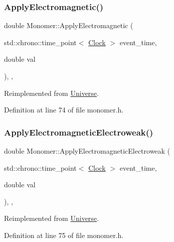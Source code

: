 \subsubsection{\texorpdfstring{Apply\+Electromagnetic()}{ApplyElectromagnetic()}}
{\footnotesize\ttfamily double Monomer\+::\+Apply\+Electromagnetic (\begin{DoxyParamCaption}\item[{std\+::chrono\+::time\+\_\+point$<$ \hyperlink{universe_8h_a0ef8d951d1ca5ab3cfaf7ab4c7a6fd80}{Clock} $>$}]{event\+\_\+time,  }\item[{double}]{val }\end{DoxyParamCaption})\hspace{0.3cm}{\ttfamily [inline]}, {\ttfamily [final]}, {\ttfamily [virtual]}}



Reimplemented from \hyperlink{class_universe_a1f787da78fa196ba635db21a9e91dabb}{Universe}.



Definition at line 74 of file monomer.\+h.

\mbox{\label{class_monomer_a4c3f9894ea57047789bec32602f033cb}} 
\subsubsection{\texorpdfstring{Apply\+Electromagnetic\+Electroweak()}{ApplyElectromagneticElectroweak()}}
{\footnotesize\ttfamily double Monomer\+::\+Apply\+Electromagnetic\+Electroweak (\begin{DoxyParamCaption}\item[{std\+::chrono\+::time\+\_\+point$<$ \hyperlink{universe_8h_a0ef8d951d1ca5ab3cfaf7ab4c7a6fd80}{Clock} $>$}]{event\+\_\+time,  }\item[{double}]{val }\end{DoxyParamCaption})\hspace{0.3cm}{\ttfamily [inline]}, {\ttfamily [final]}, {\ttfamily [virtual]}}



Reimplemented from \hyperlink{class_universe_a4c36c1ab30db993307f88363dde5e8c5}{Universe}.



Definition at line 75 of file monomer.\+h.

